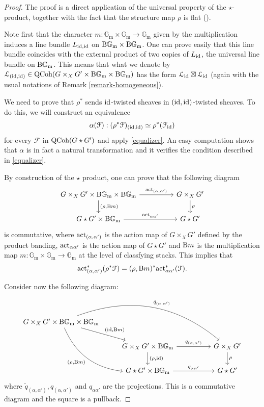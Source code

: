 \documentclass[11pt, twoside]{article} %
\numberwithin{equation}{section}
\theoremstyle{plain}
\theoremstyle{definition}
\newcommand{\act}{\textup{act}}
\newcommand{\Gm}{\mathbb G_{\mathrm{m}}}
\newcommand{\id}{\textup{id}}
\newcommand{\QCoh}{\textup{QCoh}}
\newcommand{\BGm}{\textup{B}\Gm}
\newcommand{\cF}{{\mathcal F}}
\newcommand{\cL}{\mathcal L}
\begin{document}
 \begin{proof}The proof is a direct application of the universal property of the $\star$-product, together with the fact that the structure map $\rho$ is flat (\cite[Theorem A.1]{AOV}). 
 
 Note first that the character $m:\Gm\times \Gm\to \Gm$ given by the multiplication induces a line bundle $L_{\id,\id}$ on $\BGm\times \BGm$. One can prove easily that this line bundle coincides with the external product of two copies of $L_\id$, the universal line bundle on $\BGm$. This means that what we denote by $\cL_{(\id,\id)}\in \QCoh(G\times_XG'\times \BGm\times \BGm)$ has the form $\cL_\id\boxtimes \cL_\id$ (again with the usual notations of Remark \ref{remark-homogeneous}).
		
		We need to prove that $\rho^*$ sends $\id$-twisted sheaves in $(\id,\id)$-twisted sheaves. To do this, we will construct an equivalence 
		$$ \alpha(\cF):(\rho^*\cF)_{(\id,\id)} \simeq \rho^*(\cF_{\id})$$ 
		for every $\cF$ in $\QCoh(G \star G')$ and apply \cref{equalizer}. An easy computation shows that $\alpha$ is in fact a natural transformation and it verifies the condition described in \cref{equalizer}.
		
		By construction of the $\star$ product, one can prove that the following diagram 
		$$
		\begin{tikzcd}
			G \times_X G'\times \BGm \times \BGm \arrow[rr,                  "{\act_{(\alpha,\alpha')}}"] \arrow[d, "{(\rho, \textup{B}m)}"] &  &               G\times_X G'  \arrow[d, "\rho"] \\
			G \star G' \times \BGm \arrow[rr, "\act_{\alpha\alpha'}"]                                                   &  & G \star G'                     
		\end{tikzcd}
		$$
		is commutative, where $\act_{(\alpha,\alpha')}$ is the action map of $G\times_X G'$ defined by the product banding, $\act_{\alpha\alpha'}$ is the action map of $G\star G'$ and $\textup{B}m$ is the multiplication map $m:\Gm \times \Gm \rightarrow \Gm$ at the level of classfying stacks. This implies that 
		$$\act^*_{(\alpha,\alpha')}(\rho^*\cF) =(\rho,\textup{B}m)^*\act^*_{\alpha\alpha'}(\cF).$$ 
		
		Consider now the following diagram:
		$$
		\begin{tikzcd}
			G \times_X G'\times \BGm \times \BGm \arrow[rdd, "{(\rho,\textup{B}m)}"', bend right] \arrow[rrrd, "{\tilde{q}_{(\alpha,\alpha')}}", bend left] \arrow[rd, "{(\id,\textup{B}m)}"] &                                                                                         &  &                                 \\
			& G \times_X G'\times \BGm \arrow[rr, "{q_{(\alpha,\alpha')}}"] \arrow[d, "{(\rho,\id)}"] &  & G\times_X G'  \arrow[d, "\rho"] \\
			& G \star G' \times \BGm \arrow[rr, "q_{\alpha\alpha'}"]                                 &  & G\star G'                      
		\end{tikzcd}
		$$
		where $\tilde{q}_{(\alpha,\alpha')},q_{(\alpha,\alpha')}$ and $q_{\alpha\alpha'}$ are the projections. This is a commutative diagram and the square is a pullback. 
		

\end{proof}
\end{document}
